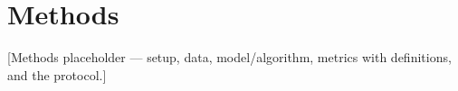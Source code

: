 \section{Methods}
[Methods placeholder — setup, data, model/algorithm, metrics with definitions, and the protocol.]
